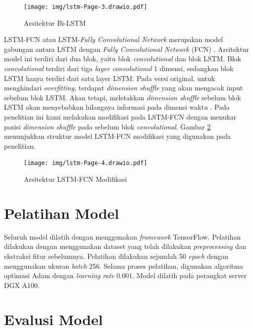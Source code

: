 \begin{figure}[H]
  \centering
  \texttt{[image: img/lstm-Page-3.drawio.pdf]}
  \caption{Arsitektur Bi-LSTM}
  \label{fig:arsbilstm}
\end{figure}

LSTM-FCN atau LSTM-\textit{Fully Convolutional Network} merupakan model gabungan antara LSTM dengan  \textit{Fully Convolutional Network} (FCN) \parencite{karimLSTMFullyConvolutional2018}. Arsitektur model ini terdiri dari dua blok, yaitu blok \textit{convolutional} dan blok LSTM. Blok \textit{convolutional} terdiri dari tiga \textit{layer convolutional} 1 dimensi, sedangkan blok LSTM hanya terdiri dari satu layer LSTM. Pada versi original, untuk menghindari \textit{overfitting}, terdapat \textit{dimension shuffle} yang akan mengacak input sebelum blok LSTM. Akan tetapi, meletakkan \textit{dimension shuffle} sebelum blok LSTM akan menyebabkan hilangnya informasi pada dimensi waktu \parencite{8713870}. Pada penelitian ini kami melakukan modifikasi pada LSTM-FCN dengan menukar posisi \textit{dimension shuffle} pada sebelum blok \textit{convolutional}. Gambar \ref{fig:arslstmfcn} menunjukkan struktur model LSTM-FCN modifikasi yang digunakan pada penelitian.

\begin{figure}[H]
  \centering
  \texttt{[image: img/lstm-Page-4.drawio.pdf]}
  \caption{Arsitektur LSTM-FCN Modifikasi}
  \label{fig:arslstmfcn}
\end{figure}

\section{Pelatihan Model}

Seluruh model dilatih dengan menggunakan \textit{framework} TensorFlow. 
Pelatihan dilakukan dengan menggunakan dataset yang telah dilakukan \textit{preprocessing} dan ekstraksi fitur sebelumnya.
Pelatihan dilakukan sejumlah 50 \textit{epoch} dengan menggunakan ukuran \textit{batch} 256.
Selama proses pelatihan, digunakan algoritma optimasi Adam dengan \textit{learning rate} 0.001.
Model dilatih pada perangkat server DGX A100.

\section{Evalusi Model}

